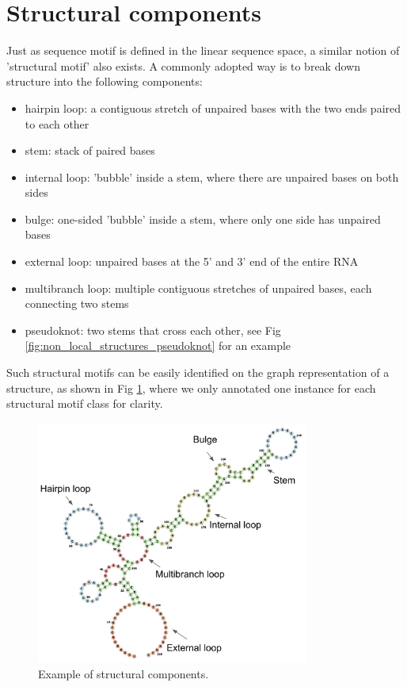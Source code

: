 \documentclass[12pt]{article}
\begin{document}
\section{Structural components}


Just as sequence motif is defined in the linear sequence space,
a similar notion of 'structural motif' also exists.
A commonly adopted way is to break down structure into the following components:

\begin{itemize}
    \item hairpin loop: a contiguous stretch of unpaired bases with the two ends paired to each other
    \item stem: stack of paired bases
    \item internal loop: 'bubble' inside a stem, where there are unpaired bases on both sides
    \item bulge: one-sided 'bubble' inside a stem, where only one side has unpaired bases
    \item external loop: unpaired bases at the 5' and 3' end of the entire RNA
    \item multibranch loop: multiple contiguous stretches of unpaired bases, each connecting two stems
    \item pseudoknot: two stems that cross each other, see Fig \ref{fig:non_local_structures_pseudoknot} for an example
\end{itemize}

Such structural motifs can be easily identified on the graph representation of a structure,
as shown in Fig \ref{fig:structural_motif_graph}, where we only annotated one instance for
each structural motif class for clarity.

\begin{figure}[h]
    \centering
    \includegraphics[width=0.8\textwidth]{plot/structural_motif_graph.png}
    \caption{Example of structural components.}
    \label{fig:structural_motif_graph}
    \centering
\end{figure}
\end{document}
